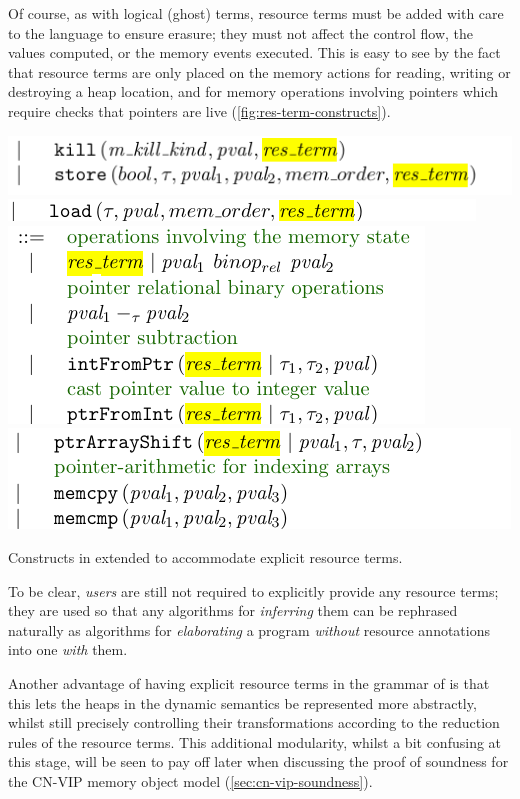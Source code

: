 Of course, as with logical (ghost) terms, resource terms must be added with
care to the language to ensure erasure; they must not affect the control flow,
the values computed, or the memory events executed. This is easy to see by the
fact that resource terms are only placed on the memory actions for reading,
writing or destroying a heap location, and for memory operations involving
pointers which require checks that pointers are live (\cref{fig:res-term-constructs}).

\begin{marginfigure}
    \centering
    \includegraphics{figures/kernel-res-term-1}
    \includegraphics{figures/kernel-res-term-2}
    \includegraphics{figures/kernel-res-term-3}
    \includegraphics{figures/kernel-res-term-4}
    \caption{Constructs in  extended to accommodate
    explicit resource terms.}\label{fig:res-term-constructs}
\end{marginfigure}

To be clear,  \emph{users} are still not required to explicitly provide
any resource terms; they are used so that any algorithms for \emph{inferring}
them can be rephrased naturally as algorithms for \emph{elaborating} a program
\emph{without} resource annotations into one \emph{with} them.

Another advantage of having explicit resource terms in the grammar of
 is that this lets the heaps in the dynamic semantics be
represented more abstractly, whilst still precisely controlling their
transformations according to the reduction rules of the resource terms. This
additional modularity, whilst a bit confusing at this stage, will be seen to
pay off later when discussing the proof of soundness for the CN-VIP memory
object model (\cref{sec:cn-vip-soundness}).

